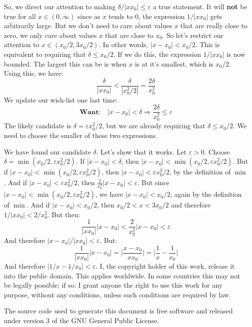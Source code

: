 \documentclass{article}
\theoremstyle{normal}
\begin{document}
    So, we direct our attention to making $\delta/|xx_{0}|\leq\varepsilon$ a
    true statement. It will \textbf{not} be true for all $x\in(0,\infty)$ since
    as $x$ tends to 0, the expression $1/|xx_{0}|$ gets arbitrarily large. But
    we don't need to care about values $x$ that are really close to zero, we
    only care about values $x$ that are close to $x_{0}$. So let's restrict
    our attention to $x\in(x_{0}/2,3x_{0}/2)$. In other words,
    $|x-x_{0}|<x_{0}/2$. This is equivalent to requiring that
    $\delta\leq{x}_{0}/2$. If we do this, the expression
    $1/|xx_{0}|$ is now bounded. The largest this can be is when $x$ is at
    it's smallest, which is $x_{0}/2$. Using this, we have:
    \begin{equation}
        \frac{\delta}{|xx_{0}|}<\frac{\delta}{|x_{0}^{2}/2|}
        =\frac{2\delta}{x_{0}^{2}}
    \end{equation}
    We update our wish-list one last time:
    \begin{equation}
        \textbf{Want:}\quad
        |x-x_{0}|<\delta
        \Rightarrow
        \frac{2\delta}{x_{0}^{2}}\leq\varepsilon
    \end{equation}
    The likely candidate is $\delta=\varepsilon{x}_{0}^{2}/2$, but we are
    already requiring that $\delta\leq{x}_{0}/2$. We need to choose the smaller
    of these two expressions.
    \par\hfill\par
    We have found our candidate $\delta$. Let's show that it works.
    Let $\varepsilon>0$. Choose $\delta=\min(x_{0}/2,\varepsilon{x}_{0}^{2}/2)$.
    If $|x-x_{0}|<\delta$, then
    $|x-x_{0}|<\min(x_{0}/2,\varepsilon{x}_{0}^{2}/2)$. But if
    $|x-x_{0}|<\min(x_{0}/2,\varepsilon{x}_{0}^{2}/2)$, then
    $|x-x_{0}|<\varepsilon{x}_{0}^{2}/2$, by the definition of $\min$. And if
    $|x-x_{0}|<\varepsilon{x}_{0}^{2}/2$, then
    $\frac{2}{x_{0}^{2}}|x-x_{0}|<\varepsilon$. But since
    $|x-x_{0}|<\min(x_{0}/2,\varepsilon{x}_{0}^{2}/2)$, we have
    $|x-x_{0}|<x_{0}/2$, again by the definition of $\min$. And if
    $|x-x_{0}|<x_{0}/2$, then $x_{0}/2<x<3x_{0}/2$ and therefore
    $1/|xx_{0}|<2/x_{0}^{2}$. But then:
    \begin{equation}
        \frac{1}{|xx_{0}|}|x-x_{0}|
        <\frac{2}{x_{0}^{2}}|x-x_{0}|<\varepsilon
    \end{equation}
    And therefore $|x-x_{0}|/|xx_{0}|<\varepsilon$. But:
    \begin{equation}
        \frac{1}{|xx_{0}|}|x-x_{0}|
        =\big|\frac{x-x_{0}}{xx_{0}}\big|
        =\big|\frac{1}{x}-\frac{1}{x_{0}}\big|
    \end{equation}
    And therefore $|1/x-1/x_{0}|<\varepsilon$.
    \newpage
    I, the copyright holder of this work, release it into the public domain.
    This applies worldwide. In some countries this may not be legally possible;
    if so: I grant anyone the right to use this work for any purpose, without
    any conditions, unless such conditions are required by law.
    \par\hfill\par
    The source code used to generate this document is free software and released
    under version 3 of the GNU General Public License.
\end{document}
